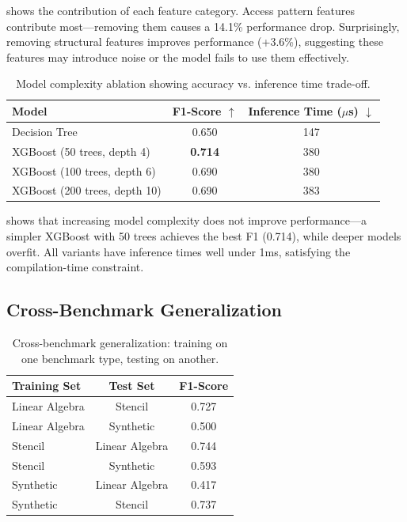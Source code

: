 \documentclass{article}
\begin{document}
 shows the contribution of each feature category. Access pattern features contribute most---removing them causes a 14.1\% performance drop. Surprisingly, removing structural features improves performance (+3.6\%), suggesting these features may introduce noise or the model fails to use them effectively.

\begin{table}[t]
\caption{Model complexity ablation showing accuracy vs. inference time trade-off.}
\label{tab:complexity}
\centering
\begin{tabular}{lcc}
\toprule
Model & F1-Score $\uparrow$ & Inference Time ($\mu$s) $\downarrow$ \\
\midrule
Decision Tree & 0.650 & 147 \\
XGBoost (50 trees, depth 4) & \textbf{0.714} & 380 \\
XGBoost (100 trees, depth 6) & 0.690 & 380 \\
XGBoost (200 trees, depth 10) & 0.690 & 383 \\
\bottomrule
\end{tabular}
\end{table}

 shows that increasing model complexity does not improve performance---a simpler XGBoost with 50 trees achieves the best F1 (0.714), while deeper models overfit. All variants have inference times well under 1ms, satisfying the compilation-time constraint.

\subsection{Cross-Benchmark Generalization}

\begin{table}[t]
\caption{Cross-benchmark generalization: training on one benchmark type, testing on another.}
\label{tab:generalization}
\centering
\begin{tabular}{lcc}
\toprule
Training Set & Test Set & F1-Score \\
\midrule
Linear Algebra & Stencil & 0.727 \\
Linear Algebra & Synthetic & 0.500 \\
Stencil & Linear Algebra & 0.744 \\
Stencil & Synthetic & 0.593 \\
Synthetic & Linear Algebra & 0.417 \\
Synthetic & Stencil & 0.737 \\
\bottomrule
\end{tabular}
\end{table}
\end{document}
